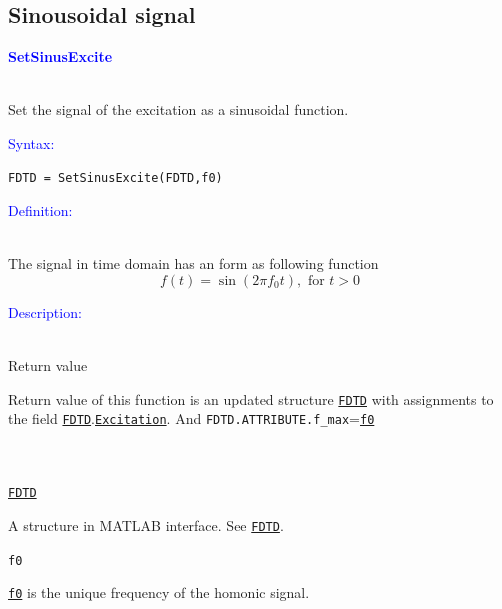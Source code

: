     \subsection{Sinousoidal signal}\label{subsec:Sinousoidal signal}
\textcolor{blue}{\begin{large}\textbf{SetSinusExcite}	\end{large}} \label{func:SetSinusExcite}\\
	  Set the signal of the excitation as a sinusoidal function.

\textcolor{blue}{\begin{large}Syntax:\end{large}}
 \begin{lstlisting}
FDTD = SetSinusExcite(FDTD,f0)
 \end{lstlisting}

\textcolor{blue}{\begin{large}Definition:\end{large}}\\
      The signal in time domain has an form as following function\\
\begin{equation}\label{equ:SinusoidalSignal_time}
 f(t)=\sin{(2\pi f_0t)}, \text{ for } t>0
\end{equation}

\textcolor{blue}{\begin{large}Description:\end{large}}\\
Return value 
	\begin{myindentpar}
	    Return value of this function is an updated structure \hyperref[para:FDTD]{\texttt{FDTD}} with assignments to the field \hyperref[para:FDTD]{\texttt{FDTD}}.\hyperref[para:Excitation]{\texttt{Excitation}}. And \texttt{FDTD.ATTRIBUTE.f\_max}=\hyperref[para:f0]{\texttt{f0}}
       \end{myindentpar}
	      \\ \\
	\hyperref[para:FDTD]{\texttt{FDTD}} 
	    \begin{myindentpar}
		A structure in MATLAB interface. See \hyperref[para:FDTD]{\texttt{FDTD}}.
	    \end{myindentpar}
	\texttt{f0}   \label{para:sin_f0} %
	    \begin{myindentpar}
		\hyperref[para:sin_f0]{\texttt{f0}}  is the unique frequency of the homonic signal. 
	    \end{myindentpar}

